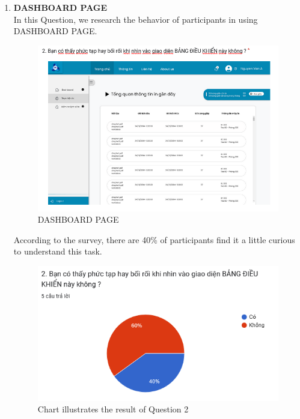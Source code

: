 \begin{enumerate}
    \item \textbf{DASHBOARD PAGE} \\
    In this Question, we research the behavior of participants in using DASHBOARD PAGE.
\begin{figure}[!h]
    \centering
    \includegraphics[width=0.8\linewidth]{images/image_uasbility/Q2_Stu.png}
    \caption{DASHBOARD PAGE}
    \label{fig:DASHBOARD}
\end{figure}
\newpage
According to the survey, there are 40\% of participants find it a little curious to understand this task.
\begin{figure}[!h]
    \centering
    \includegraphics[width=0.8\linewidth]{images/image_uasbility/A2_Stu.png}
    \caption{Chart illustrates the result of Question 2}
    \label{fig:Chart illustrates the result of Question 2}
\end{figure}


\end{enumerate}
